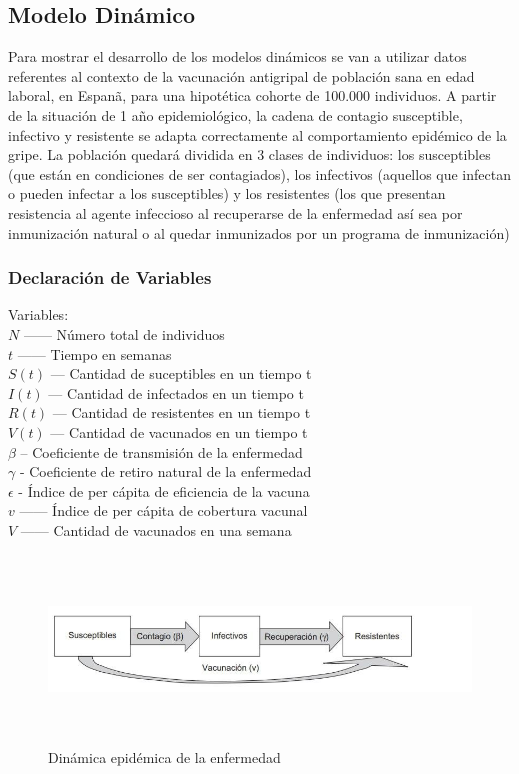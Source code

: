 \documentclass{wscpaperproc}
\theoremstyle{wsc}
\begin{document}
\subsection{Modelo Din\'amico}
Para mostrar el desarrollo de los modelos din\'amicos se van a
utilizar datos referentes al contexto de la vacunaci\'on antigripal de poblaci\'on sana en edad laboral, en Espan\~a, para una hipot\'etica
cohorte de 100.000 individuos. A partir de la situaci\'on de 1 a\~no
epidemiol\'ogico, la cadena de contagio susceptible, infectivo y
resistente se adapta correctamente al comportamiento
epid\'emico de la gripe.
 La poblaci\'on quedar\'a dividida en 3 clases
de individuos: los susceptibles (que est\'an en condiciones de ser
contagiados), los infectivos (aquellos que infectan o pueden
infectar a los susceptibles) y los resistentes (los que presentan
resistencia al agente infeccioso al recuperarse de la enfermedad as\'i sea por inmunizaci\'on natural o al quedar inmunizados por un
programa de inmunizaci\'on)
\\
\clearpage
\subsubsection{Declaraci\'on de Variables}
Variables:\\
$N$ ------ N\'umero total de individuos\\
$t$ ------ Tiempo en semanas\\
$S(t)$ --- Cantidad de suceptibles en un tiempo t\\
$I(t)$ --- Cantidad de infectados en un tiempo t\\
$R(t)$ --- Cantidad de resistentes en un tiempo t\\
$V(t)$ --- Cantidad de vacunados en un tiempo t\\
$\beta$ -- Coeficiente de transmisi\'on de la enfermedad\\
$\gamma$ - Coeficiente de retiro natural de la enfermedad\\
$\epsilon$ - \'Indice de per c\'apita de eficiencia de la vacuna\\
$v$ ------ \'Indice de per c\'apita de cobertura vacunal\\
$V$ ------ Cantidad de vacunados en una semana\\


\begin{figure}
	\centering
	\includegraphics[width=1.0\textwidth,height=5cm]{Esquema1.jpg}
	\caption{Din\'amica epid\'emica de la enfermedad}
\end{figure}
\end{document}

